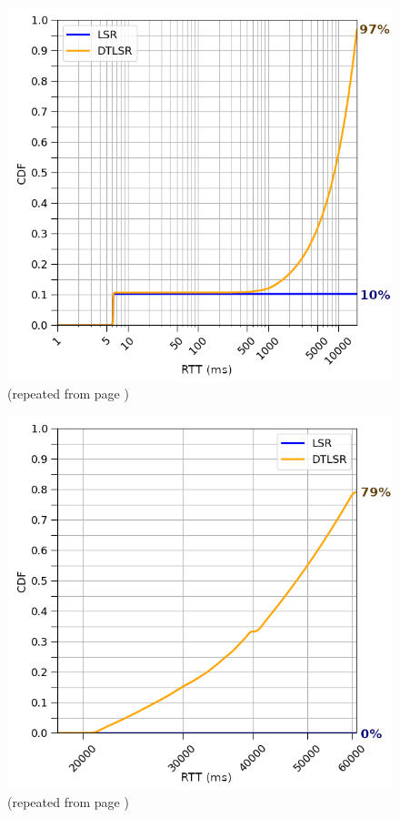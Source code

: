\documentclass[withindex,glossary,openany]{cam-thesis}
\newcommand{\repeatcaption}[2]{%
  \renewcommand{\thefigure}{\ref{#1}}%
  \captionsetup{list=no}%
  \caption{#2 (repeated from page \pageref{#1})}%
  \addtocounter{figure}{-1}%
}
\begin{document}
\begin{minipage}{0.5\textwidth}
\begin{figure}[H]
  \includegraphics[width=1\linewidth]{delay_partition_flap2_18}
  \repeatcaption{fig:partition_2_18}{}
\end{figure}
\end{minipage}%
\begin{minipage}{0.5\textwidth}
\begin{figure}[H]
  \includegraphics[width=1\linewidth]{delay_full_partition_flap20}
  \repeatcaption{fig:full_partition_flap20}{}
\end{figure}
\end{minipage}
\end{document}
